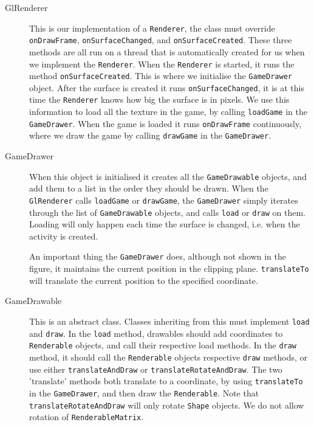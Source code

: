 \begin{description}
\item[GlRenderer] This is our implementation of a \lstinline|Renderer|, the class must override \lstinline|onDrawFrame|, \lstinline|onSurfaceChanged|, and \lstinline|onSurfaceCreated|. These three methods are all run on a thread that is automatically created for us when we implement the \lstinline|Renderer|. When the \lstinline|Renderer| is started, it runs the method \lstinline|onSurfaceCreated|. This is where we initialise the \lstinline|GameDrawer| object. After the surface is created it runs \lstinline|onSurfaceChanged|, it is at this time the \lstinline|Renderer| knows how big the surface is in pixels. We use this information to load all the texture in the game, by calling \lstinline|loadGame| in the \lstinline|GameDrawer|. When the game is loaded it runs \lstinline|onDrawFrame| continuously, where we draw the game by calling \lstinline|drawGame| in the \lstinline|GameDrawer|.

\item[GameDrawer] When this object is initialised it creates all the \lstinline|GameDrawable| objects, and add them to a list in the order they should be drawn. When the \lstinline|GlRenderer| calls \lstinline|loadGame| or \lstinline|drawGame|, the \lstinline|GameDrawer| simply iterates through the list of \lstinline|GameDrawable| objects, and calls \lstinline|load| or \lstinline|draw| on them. Loading will only happen each time the surface is changed, i.e. when the activity is created.

An important thing the \lstinline|GameDrawer| does, although not shown in the figure, it maintains the current position in the clipping plane. \lstinline|translateTo| will translate the current position to the specified coordinate.

\item[GameDrawable] This is an abstract class. Classes inheriting from this must implement \lstinline|load| and \lstinline|draw|. In the \lstinline|load| method, drawables should add coordinates to \lstinline|Renderable| objects, and call their respective load methods. In the \lstinline|draw| method, it should call the \lstinline|Renderable| objects respective \lstinline|draw| methods, or use either \lstinline|translateAndDraw| or \lstinline|translateRotateAndDraw|. The two 'translate' methods both translate to a coordinate, by using \lstinline|translateTo| in the \lstinline|GameDrawer|, and then draw the \lstinline|Renderable|. Note that \lstinline|translateRotateAndDraw| will only rotate \lstinline|Shape| objects. We do not allow rotation of \lstinline|RenderableMatrix|.


\end{description}
